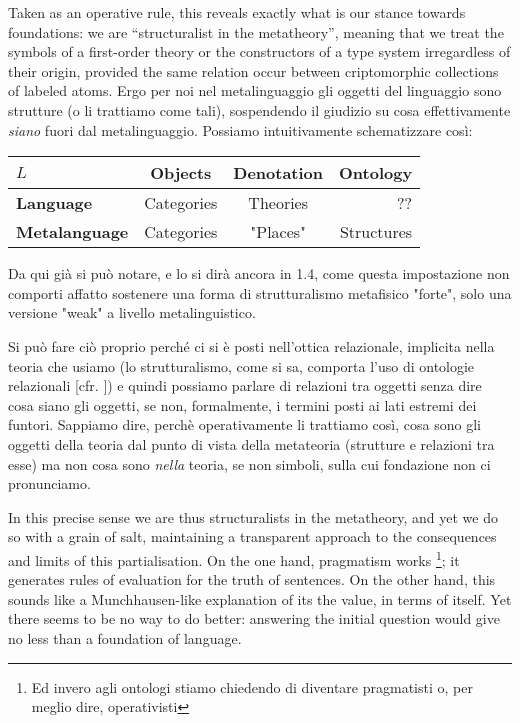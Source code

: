 \documentclass[a4paper, 11pt]{article}
\begin{document}
	Taken as an operative rule, this reveals exactly what is our stance towards foundations: we are ``structuralist in the metatheory'', meaning that we treat the symbols of a first-order theory or the constructors of a type system irregardless of their origin, provided the same relation occur between criptomorphic collections of labeled atoms. Ergo per noi nel metalinguaggio gli oggetti del linguaggio sono strutture (o li trattiamo come tali), sospendendo il giudizio su cosa effettivamente \emph{siano} fuori dal metalinguaggio. Possiamo intuitivamente schematizzare così:
 \begin{center}
 	\begin{tabular}{lccr}\toprule 
 		$L$ & Objects & Denotation & Ontology \\
 		\midrule
 		\textbf{Language} & Categories & Theories & ?? \\
 		\midrule
 		\textbf{Metalanguage} & Categories & "Places" & Structures 
 	\end{tabular} 
 \end{center}
Da qui già si può notare, e lo si dirà ancora in 1.4, come questa impostazione non comporti affatto sostenere una forma di strutturalismo metafisico "forte", solo una versione "weak" a livello metalinguistico. 

Si può fare ciò proprio perché ci si è posti nell'ottica relazionale, implicita nella teoria che usiamo (lo strutturalismo, come si sa, comporta l'uso di ontologie relazionali [cfr. \cite{??}]) e quindi possiamo parlare di relazioni tra oggetti senza dire cosa siano gli oggetti, se non, formalmente, i termini posti ai lati estremi dei funtori. Sappiamo dire, perchè operativamente li trattiamo così, cosa sono gli oggetti della teoria dal punto di vista della metateoria (strutture e relazioni tra esse) ma non cosa sono \textit{nella} teoria, se non simboli, sulla cui fondazione non ci pronunciamo. 
	
	In this precise sense we are thus structuralists in the metatheory, and yet we do so with a grain of salt, maintaining a transparent approach to the consequences and limits of this partialisation. On the one hand, pragmatism works \footnote{Ed invero agli ontologi stiamo chiedendo di diventare pragmatisti o, per meglio dire, operativisti}; it generates rules of evaluation for the truth of sentences. On the other hand, this sounds like a Munchhausen-like explanation of its the value, in terms of itself. Yet there seems to be no way to do better: answering the initial question would give no less than a foundation of language.
	
\end{document}
